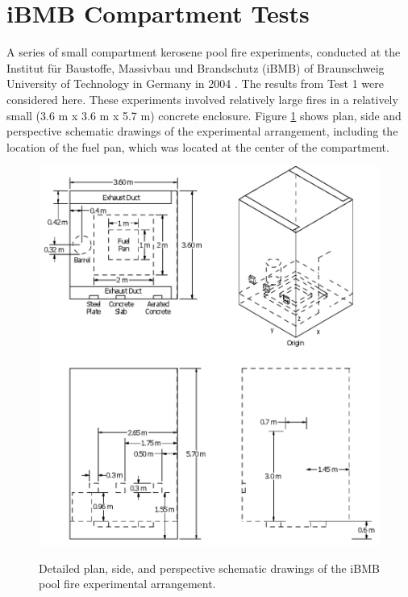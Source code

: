 \section{iBMB Compartment Tests}

A series of small compartment kerosene pool fire experiments, conducted at the
Institut f\"ur Baustoffe, Massivbau und Brandschutz (iBMB) of Braunschweig University of
Technology in Germany in 2004 \cite{Klein-Helbetaling:2005}.  The results from Test 1 were
considered here.  These experiments involved relatively large fires in a relatively small (3.6 m x 3.6 m x 5.7 m) concrete enclosure. Figure  \ref{fig:iBMB_Pool_Detailed} shows plan, side and perspective schematic drawings
of the experimental arrangement, including the location of the fuel pan, which was located at the
center of the compartment.

\begin{figure}
\begin{center}
\includegraphics[width=6.5in]{FIGURES/iBMB/iBMB_Pool}\\
\end{center}
\caption{Detailed plan, side, and perspective schematic drawings of the iBMB pool fire experimental arrangement.}
 \label{fig:iBMB_Pool_Detailed}
\end{figure}

